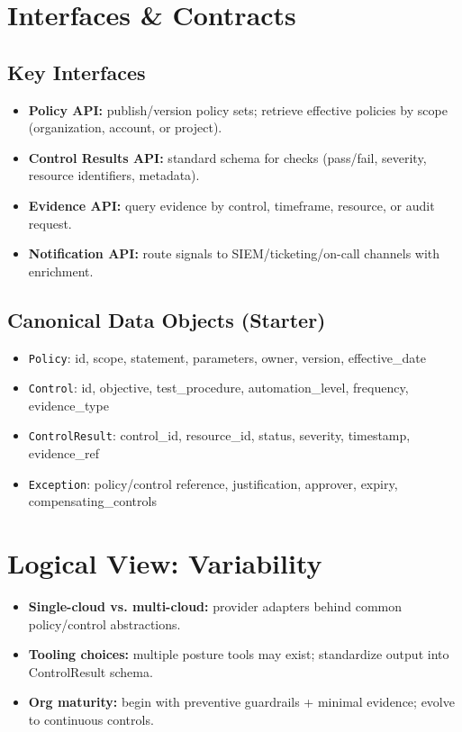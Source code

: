 \documentclass[11pt]{report}
\begin{document}
\section{Interfaces \& Contracts}
\subsection{Key Interfaces}
\begin{itemize}
  \item \textbf{Policy API:} publish/version policy sets; retrieve effective policies by scope (organization, account, or project).
  \item \textbf{Control Results API:} standard schema for checks (pass/fail, severity, resource identifiers, metadata).
  \item \textbf{Evidence API:} query evidence by control, timeframe, resource, or audit request.
  \item \textbf{Notification API:} route signals to SIEM/ticketing/on-call channels with enrichment.
\end{itemize}

\subsection{Canonical Data Objects (Starter)}
\begin{itemize}
  \item \texttt{Policy}: id, scope, statement, parameters, owner, version, effective\_date
  \item \texttt{Control}: id, objective, test\_procedure, automation\_level, frequency, evidence\_type
  \item \texttt{ControlResult}: control\_id, resource\_id, status, severity, timestamp, evidence\_ref
  \item \texttt{Exception}: policy/control reference, justification, approver, expiry, compensating\_controls
\end{itemize}

\section{Logical View: Variability}
\begin{itemize}
  \item \textbf{Single-cloud vs. multi-cloud:} provider adapters behind common policy/control abstractions.
  \item \textbf{Tooling choices:} multiple posture tools may exist; standardize output into ControlResult schema.
  \item \textbf{Org maturity:} begin with preventive guardrails + minimal evidence; evolve to continuous controls.
\end{itemize}
\end{document}
